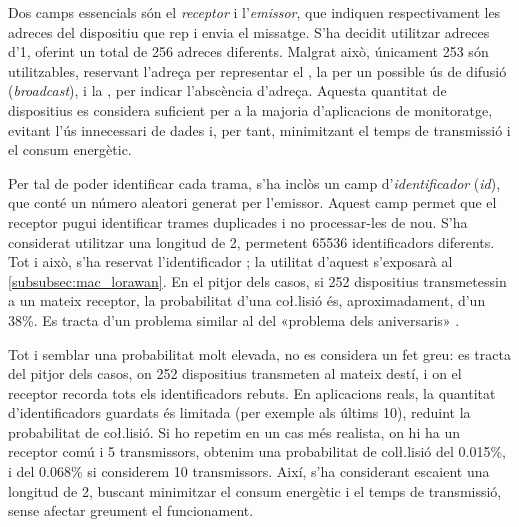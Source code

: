 \documentclass{tfgitic}[2024/07/01]
\begin{document}
Dos camps essencials són el \emph{receptor} i l'\emph{emissor}, que indiquen respectivament les adreces del dispositiu que rep i envia el missatge. S'ha decidit utilitzar adreces d'\SI{1}{\byte}, oferint un total de 256 adreces diferents. Malgrat això, únicament 253 són utilitzables, reservant l'adreça  per representar el , la  per un possible ús de difusió (\emph{broadcast}), i la , per indicar l'abscència d'adreça. Aquesta quantitat de dispositius es considera suficient per a la majoria d'aplicacions de monitoratge, evitant l'ús innecessari de dades i, per tant, minimitzant el temps de transmissió i el consum energètic.

Per tal de poder identificar cada trama, s'ha inclòs un camp d'\emph{identificador} (\emph{id}), que conté un número aleatori generat per l'emissor. Aquest camp permet que el receptor pugui identificar trames duplicades i no processar-les de nou. S'ha considerat utilitzar una longitud de \SI{2}{\byte}, permetent 65536 identificadors diferents. Tot i això, s'ha reservat l'identificador ; la utilitat d'aquest s'exposarà al \autoref{subsubsec:mac_lorawan}. En el pitjor dels casos, si 252 dispositius transmetessin a un mateix receptor, la probabilitat d'una co\l.lisió és, aproximadament, d'un 38\%. Es tracta d'un problema similar al del «problema dels aniversaris» \cite{noauthor_birthday_2025}.

Tot i semblar una probabilitat molt elevada, no es considera un fet greu: es tracta del pitjor dels casos, on 252 dispositius transmeten al mateix destí, i on el receptor recorda tots els identificadors rebuts. En aplicacions reals, la quantitat d'identificadors guardats és limitada (per exemple als últims 10), reduint la probabilitat de co\l.lisió. Si ho repetim en un cas més realista, on hi ha un receptor comú i 5 transmissors, obtenim una probabilitat de col\l.lisió del 0.015\%, i del 0.068\% si considerem 10 transmissors. Així, s'ha considerant escaient una longitud de \SI{2}{\byte}, buscant minimitzar el consum energètic i el temps de transmissió, sense afectar greument el funcionament.
\end{document}
